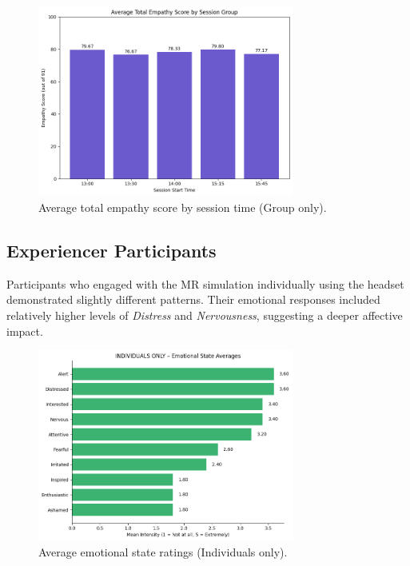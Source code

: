 \begin{figure}[htbp]
    \centering
    \includegraphics[width=0.75\textwidth]{../../Figures/post-session-grp-empathy.png}
    \caption{Average total empathy score by session time (Group only).}
    \label{fig:empathy_group_sessions}
\end{figure}


\subsection{Experiencer Participants}

Participants who engaged with the MR simulation individually using the headset demonstrated slightly different patterns. Their emotional responses included relatively higher levels of \textit{Distress} and \textit{Nervousness}, suggesting a deeper affective impact.

\begin{figure}[H]
    \centering
    \includegraphics[width=0.75\textwidth]{../../Figures/emotional-post-indiv.png}
    \caption{Average emotional state ratings (Individuals only).}
    \label{fig:emotional_post_indiv}
\end{figure}

